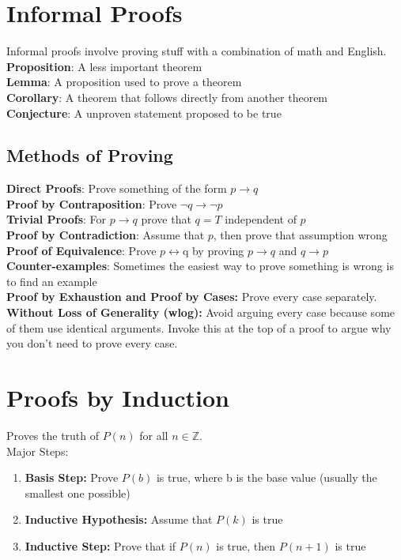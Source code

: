 \documentclass[letter]{article}
\begin{document}
\begin{multicols}{2}

  \section{Informal Proofs}
  Informal proofs involve proving stuff with a combination of math and English.
  \\
  \textbf{Proposition}: A less important theorem \\
  \textbf{Lemma}: A proposition used to prove a theorem \\
  \textbf{Corollary}: A theorem that follows directly from another theorem \\
  \textbf{Conjecture}: A unproven statement proposed to be true \\

  \subsection{Methods of Proving}
  \textbf{Direct Proofs}: Prove something of the form $p \rightarrow q$ \\
  \textbf{Proof by Contraposition}: Prove $\neg q \rightarrow \neg p$ \\
  \textbf{Trivial Proofs}: For $p \rightarrow q$ prove that $q = T$ independent
  of $p$ \\
  \textbf{Proof by Contradiction}: Assume that $p$, then prove that assumption
  wrong \\
  \textbf{Proof of Equivalence}: Prove $p \leftrightarrow $q by proving
  $p \rightarrow q$ and $q \rightarrow p$ \\
  \textbf{Counter-examples}: Sometimes the easiest way to prove something is
  wrong is to find an example\\
  \textbf{Proof by Exhaustion and Proof by Cases:} Prove every case separately.\\
  \textbf{Without Loss of Generality (wlog):} Avoid arguing every case 
  because some of them use identical arguments. Invoke this at the top 
  of a proof to argue why you don't need to prove every case.

  \section{Proofs by Induction}
  Proves the truth of $P(n)$ for all $n \in \mathbb{Z}$.\\
  Major Steps:
  \begin{enumerate}
    \item \textbf{Basis Step:} Prove $P(b)$ is true, where b is the base value
          (usually the smallest one possible)
    \item \textbf{Inductive Hypothesis:} Assume that $P(k)$ is true
    \item \textbf{Inductive Step:} Prove that if $P(n)$ is true, then $P(n + 1)$
          is true
  \end{enumerate}


\end{multicols}
\end{document}
